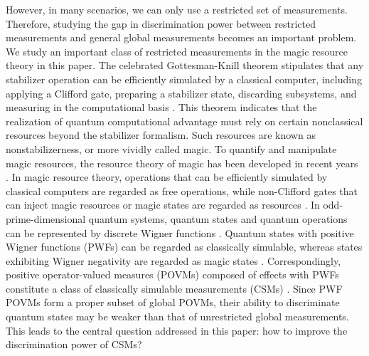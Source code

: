 \documentclass[aps,pra,twocolumn,floatfix,amsfonts,10pt]{revtex4-2}
\begin{document}
However, in many scenarios, we can only use a restricted set of measurements.
Therefore, studying the gap in discrimination power between restricted measurements and general global measurements becomes an important problem.
We study an important class of restricted measurements in the magic resource theory in this paper. 
The celebrated Gottesman-Knill theorem stipulates that any stabilizer operation can be efficiently simulated by a classical computer, including applying a Clifford gate, preparing a stabilizer state, discarding subsystems, and measuring in the computational basis \cite{G1999,VMG+2014,CG2019}. 
This theorem indicates that the realization of quantum computational advantage must rely on certain nonclassical resources beyond the stabilizer formalism. 
Such resources are known as nonstabilizerness, or more vividly called magic.
To quantify and manipulate magic resources, the resource theory of magic has been developed in recent years \cite{VFG+2012,HC2017}. 
In magic resource theory, operations that can be efficiently simulated by classical computers are regarded as free operations, while non-Clifford gates that can inject magic resources or magic states are regarded as resources \cite{BK2005}. 
In odd-prime-dimensional quantum systems, quantum states and quantum operations can be represented by discrete Wigner functions \cite{W1987}. 
Quantum states with positive Wigner functions (PWFs) can be regarded as  classically simulable, whereas states exhibiting Wigner negativity are regarded as magic states \cite{G2007}. 
Correspondingly, positive operator-valued measures (POVMs) composed of effects with PWFs constitute a class of classically simulable measurements (CSMs) \cite{ME2012,ZLZ+2024,WL2026++}. 
Since PWF POVMs form a proper subset of global POVMs, their ability to discriminate quantum states may be weaker than that of unrestricted global measurements. 
This leads to the central question addressed in this paper: how to improve the discrimination power of CSMs?
\end{document}

